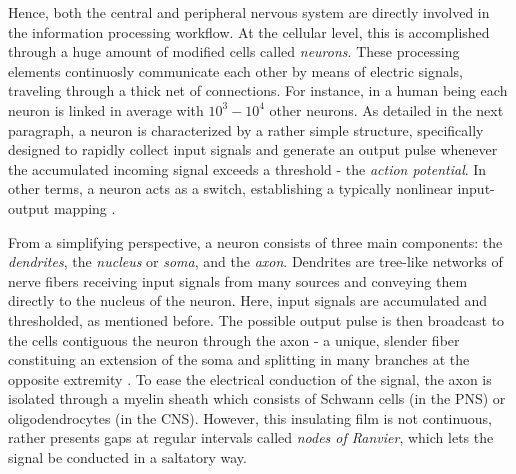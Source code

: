 \documentclass[11pt, a4paper]{report}
\numberwithin{equation}{chapter}
\theoremstyle{theorem}
\theoremstyle{definition}
\numberwithin{figure}{section}
\begin{document}
		Hence, both the central and peripheral nervous system are directly involved in the information processing workflow. At the cellular level, this is accomplished through a huge amount of modified cells called \emph{neurons}. These processing elements continuosly communicate each other by means of electric signals, traveling through a thick net of connections. For instance, in a human being each neuron is linked in average with $10^3 - 10^4$ other neurons. As detailed in the next paragraph, a neuron is characterized by a rather simple structure, specifically designed to rapidly collect input signals and generate an output pulse whenever the accumulated incoming signal exceeds a threshold - the \emph{action potential}. In other terms, a neuron acts as a switch, establishing a typically nonlinear input-output mapping \cite{Kri}.
		
		From a simplifying perspective, a neuron consists of three main components: the \emph{dendrites}, the \emph{nucleus} or \emph{soma}, and the \emph{axon}. Dendrites are tree-like networks of nerve fibers receiving input signals from many sources and conveying them directly to the nucleus of the neuron. Here, input signals are accumulated and thresholded, as mentioned before. The possible output pulse is then broadcast to the cells contiguous the neuron through the axon - a unique, slender fiber constituing an extension of the soma and splitting in many branches at the opposite extremity \cite{SD}. To ease the electrical conduction of the signal, the axon is isolated through a myelin sheath which consists of Schwann cells (in the PNS) or oligodendrocytes (in the CNS). However, this insulating film is not continuous, rather presents gaps at regular intervals called \emph{nodes of Ranvier}, which lets the signal be conducted in a saltatory way.
		
\end{document}
